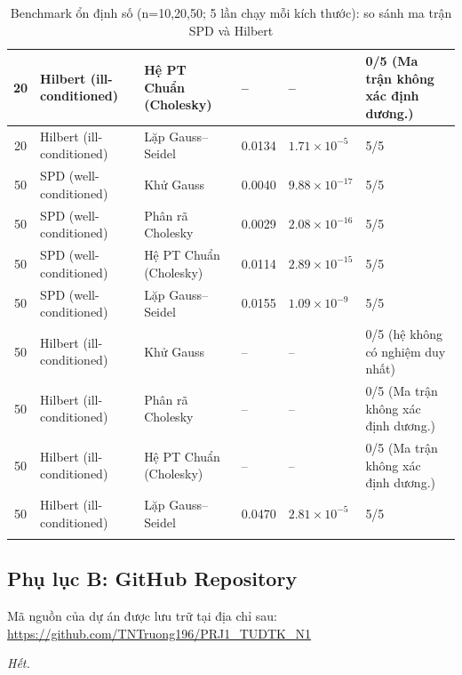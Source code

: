 \documentclass[a4paper]{article}
\begin{document}
\begin{longtable}{|c|p{}|p{}|p{}|p{}|p{}|}
20 & Hilbert (ill-conditioned) & Hệ PT Chuẩn (Cholesky) & -- & -- & 0/5 (Ma trận không xác định dương.) \\ \hline
20 & Hilbert (ill-conditioned) & Lặp Gauss--Seidel & 0.0134 & $1.71\times 10^{-5}$ & 5/5 \\ \hline
50 & SPD (well-conditioned) & Khử Gauss & 0.0040 & $9.88\times 10^{-17}$ & 5/5 \\ \hline
50 & SPD (well-conditioned) & Phân rã Cholesky & 0.0029 & $2.08\times 10^{-16}$ & 5/5 \\ \hline
50 & SPD (well-conditioned) & Hệ PT Chuẩn (Cholesky) & 0.0114 & $2.89\times 10^{-15}$ & 5/5 \\ \hline
50 & SPD (well-conditioned) & Lặp Gauss--Seidel & 0.0155 & $1.09\times 10^{-9}$ & 5/5 \\ \hline
50 & Hilbert (ill-conditioned) & Khử Gauss & -- & -- & 0/5 (hệ không có nghiệm duy nhất) \\ \hline
50 & Hilbert (ill-conditioned) & Phân rã Cholesky & -- & -- & 0/5 (Ma trận không xác định dương.) \\ \hline
50 & Hilbert (ill-conditioned) & Hệ PT Chuẩn (Cholesky) & -- & -- & 0/5 (Ma trận không xác định dương.) \\ \hline
50 & Hilbert (ill-conditioned) & Lặp Gauss--Seidel & 0.0470 & $2.81\times 10^{-5}$ & 5/5 \\ \hline
\caption{Benchmark ổn định số (n=10,20,50; 5 lần chạy mỗi kích thước): so sánh ma trận SPD và Hilbert}
\label{tab:appendix_stability_benchmark}
\end{longtable}
\endgroup

\subsection*{Phụ lục B: GitHub Repository}

Mã nguồn của dự án được lưu trữ tại địa chỉ sau: 
\url{https://github.com/TNTruong196/PRJ1_TUDTK_N1}

\centering
\textit{Hết.}
\end{document}
